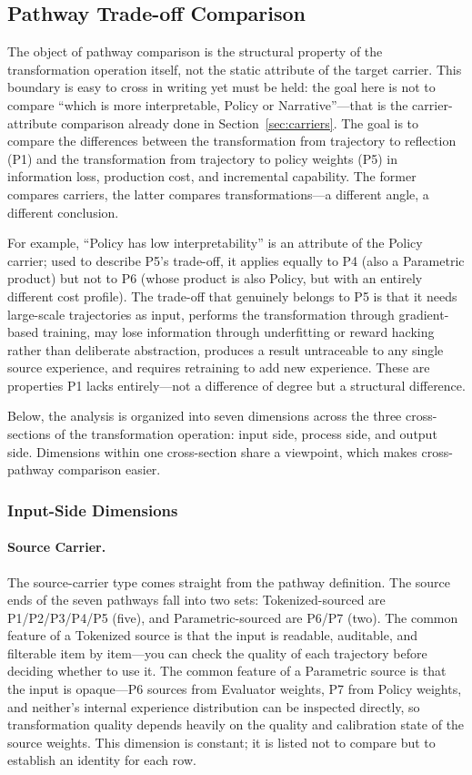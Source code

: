 \subsection{Pathway Trade-off Comparison}
\label{sec:pathway-tradeoff}

The object of pathway comparison is the structural property of the transformation operation itself, not the static attribute of the target carrier. This boundary is easy to cross in writing yet must be held: the goal here is not to compare ``which is more interpretable, Policy or Narrative''---that is the carrier-attribute comparison already done in Section~\ref{sec:carriers}. The goal is to compare the differences between the transformation from trajectory to reflection (P1) and the transformation from trajectory to policy weights (P5) in information loss, production cost, and incremental capability. The former compares carriers, the latter compares transformations---a different angle, a different conclusion.

For example, ``Policy has low interpretability'' is an attribute of the Policy carrier; used to describe P5's trade-off, it applies equally to P4 (also a Parametric product) but not to P6 (whose product is also Policy, but with an entirely different cost profile). The trade-off that genuinely belongs to P5 is that it needs large-scale trajectories as input, performs the transformation through gradient-based training, may lose information through underfitting or reward hacking rather than deliberate abstraction, produces a result untraceable to any single source experience, and requires retraining to add new experience. These are properties P1 lacks entirely---not a difference of degree but a structural difference.

Below, the analysis is organized into seven dimensions across the three cross-sections of the transformation operation: input side, process side, and output side. Dimensions within one cross-section share a viewpoint, which makes cross-pathway comparison easier.

\subsubsection{Input-Side Dimensions}

\paragraph{Source Carrier.} The source-carrier type comes straight from the pathway definition. The source ends of the seven pathways fall into two sets: Tokenized-sourced are P1/P2/P3/P4/P5 (five), and Parametric-sourced are P6/P7 (two). The common feature of a Tokenized source is that the input is readable, auditable, and filterable item by item---you can check the quality of each trajectory before deciding whether to use it. The common feature of a Parametric source is that the input is opaque---P6 sources from Evaluator weights, P7 from Policy weights, and neither's internal experience distribution can be inspected directly, so transformation quality depends heavily on the quality and calibration state of the source weights. This dimension is constant; it is listed not to compare but to establish an identity for each row.

